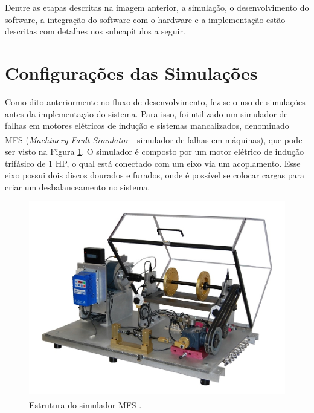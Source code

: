 Dentre as etapas descritas na imagem anterior, a simulação, o desenvolvimento do software, a integração do software com o hardware e a implementação
estão descritas com detalhes nos subcapítulos a seguir.


% 

\section{Configurações das Simulações}

Como dito anteriormente no fluxo de desenvolvimento, fez se o uso de simulações antes da implementação do sistema.
Para isso, foi utilizado um simulador de falhas em motores elétricos de indução e sistemas mancalizados, denominado
MFS \textsuperscript \textregistered (\textit{Machinery Fault Simulator} - simulador de falhas em máquinas), que pode ser visto na Figura 
\ref{fig:real_plant}. O simulador é composto por um motor elétrico de indução trifásico de 1 HP, o qual está conectado com um eixo via um 
acoplamento. Esse eixo possui dois discos dourados e furados, onde é possível se colocar cargas para criar um desbalanceamento no sistema.

\begin{figure}[H]
    \caption{Estrutura do simulador MFS \textsuperscript \textregistered.}
    \begin{center}
        \includegraphics[scale=.4]{metodologia/img/real_plant.jpeg}
    \end{center}
    \label{fig:real_plant}
\end{figure}


